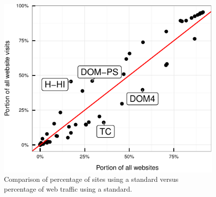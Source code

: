\begin{figure}[th]
  \centering
  \includegraphics[width=.5\textwidth]{figures/sites_vs_visits_scatter.pdf}
  \caption{Comparison of percentage of sites using a standard versus percentage of web traffic using a standard.}
  \label{fig:feature-pop-by-site-pop}
\end{figure}

